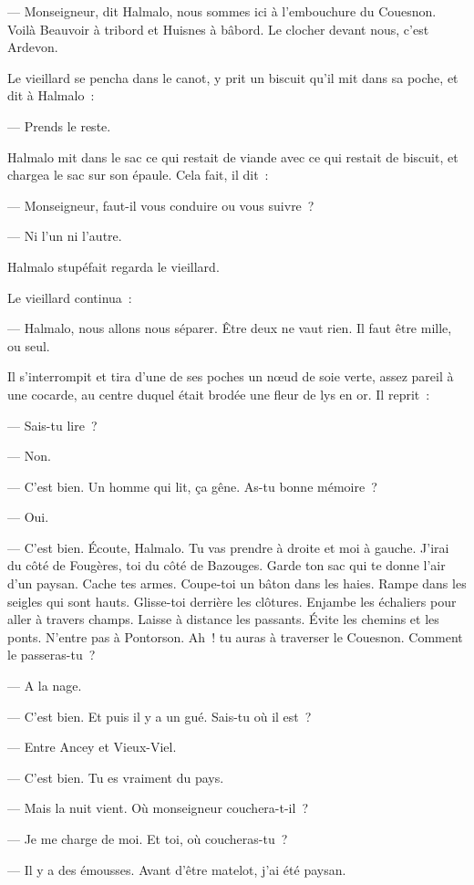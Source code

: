 \documentclass[french,twoside]{book} %
\begin{document}
— Monseigneur, dit Halmalo, nous sommes ici à l’embouchure du Couesnon. Voilà Beauvoir à tribord et Huisnes à bâbord. Le clocher devant nous, c’est Ardevon.\par
Le vieillard se pencha dans le canot, y prit un biscuit qu’il mit dans sa poche, et dit à Halmalo :\par
— Prends le reste.\par
Halmalo mit dans le sac ce qui restait de viande avec ce qui restait de biscuit, et chargea le sac sur son épaule. Cela fait, il dit :\par
 — Monseigneur, faut-il vous conduire ou vous suivre ?\par
— Ni l’un ni l’autre.\par
Halmalo stupéfait regarda le vieillard.\par
Le vieillard continua :\par
— Halmalo, nous allons nous séparer. Être deux ne vaut rien. Il faut être mille, ou seul.\par
Il s’interrompit et tira d’une de ses poches un nœud de soie verte, assez pareil à une cocarde, au centre duquel était brodée une fleur de lys en or. Il reprit :\par
— Sais-tu lire ?\par
— Non.\par
— C’est bien. Un homme qui lit, ça gêne. As-tu bonne mémoire ?\par
— Oui.\par
— C’est bien. Écoute, Halmalo. Tu vas prendre à droite et moi à gauche. J’irai du côté de Fougères, toi du côté de Bazouges. Garde ton sac qui te donne l’air d’un paysan. Cache tes armes. Coupe-toi un bâton dans les haies. Rampe dans les seigles qui sont hauts. Glisse-toi derrière les clôtures. Enjambe les échaliers pour aller à travers champs. Laisse à distance les passants. Évite les chemins et les ponts. N’entre pas à Pontorson. Ah ! tu auras à traverser le Couesnon. Comment le passeras-tu ?\par
— A la nage.\par
— C’est bien. Et puis il y a un gué. Sais-tu où il est ?\par
— Entre Ancey et Vieux-Viel.\par
— C’est bien. Tu es vraiment du pays.\par
 — Mais la nuit vient. Où monseigneur couchera-t-il ?\par
— Je me charge de moi. Et toi, où coucheras-tu ?\par
— Il y a des émousses. Avant d’être matelot, j’ai été paysan.\par
\end{document}
